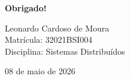 \documentclass[12pt,aspectratio=16:9]{beamer}
\begin{document}
\begin{frame}
    \centering
    \vspace{2cm}
    {\huge \textbf{Obrigado!}}
    
    \vspace{1cm}
    
    {\Large Leonardo Cardoso de Moura}\\
    {\small Matrícula: 32021BSI004}\\
    {\small Disciplina: Sistemas Distribuídos}
    
    \vspace{2cm}
    
    {\small 08 de maio de 2026}
\end{frame}
\end{document}
